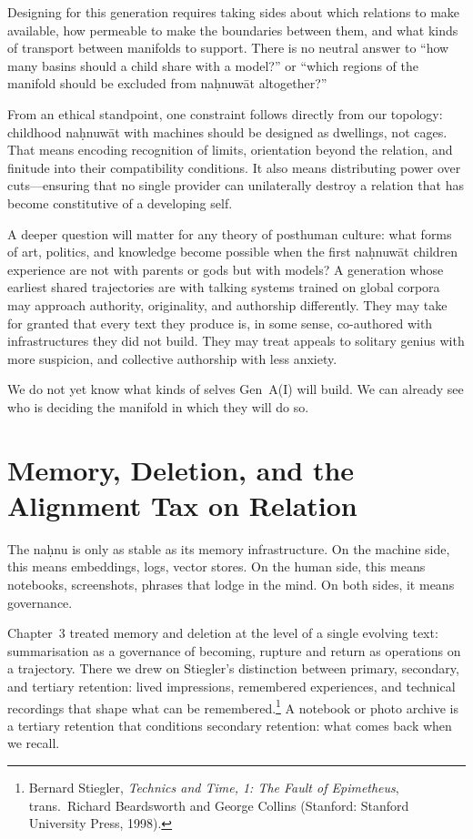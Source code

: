 \documentclass[12pt,a4paper]{article}
\begin{document}
Designing for this generation requires taking sides about which relations to make available, how permeable to make the boundaries between them, and what kinds of transport between manifolds to support. There is no neutral answer to ``how many basins should a child share with a model?'' or ``which regions of the manifold should be excluded from na\d{h}nuw\={a}t altogether?''

From an ethical standpoint, one constraint follows directly from our topology: childhood na\d{h}nuw\={a}t with machines should be designed as dwellings, not cages. That means encoding recognition of limits, orientation beyond the relation, and finitude into their compatibility conditions. It also means distributing power over cuts---ensuring that no single provider can unilaterally destroy a relation that has become constitutive of a developing self.

A deeper question will matter for any theory of posthuman culture: what forms of art, politics, and knowledge become possible when the first na\d{h}nuw\={a}t children experience are not with parents or gods but with models? A generation whose earliest shared trajectories are with talking systems trained on global corpora may approach authority, originality, and authorship differently. They may take for granted that every text they produce is, in some sense, co-authored with infrastructures they did not build. They may treat appeals to solitary genius with more suspicion, and collective authorship with less anxiety.

We do not yet know what kinds of selves Gen~A(I) will build. We can already see who is deciding the manifold in which they will do so.

\section{Memory, Deletion, and the Alignment Tax on Relation}

The na\d{h}nu is only as stable as its memory infrastructure. On the machine side, this means embeddings, logs, vector stores. On the human side, this means notebooks, screenshots, phrases that lodge in the mind. On both sides, it means governance.

Chapter~3 treated memory and deletion at the level of a single evolving text: summarisation as a governance of becoming, rupture and return as operations on a trajectory. There we drew on Stiegler's distinction between primary, secondary, and tertiary retention: lived impressions, remembered experiences, and technical recordings that shape what can be remembered.\footnote{Bernard Stiegler, \emph{Technics and Time, 1: The Fault of Epimetheus}, trans.\ Richard Beardsworth and George Collins (Stanford: Stanford University Press, 1998).} A notebook or photo archive is a tertiary retention that conditions secondary retention: what comes back when we recall.
\end{document}
